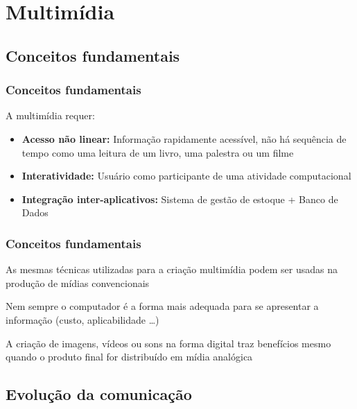 \documentclass[xcolor]{beamer}
\begin{document}
\section{Multimídia}
\subsection{Conceitos fundamentais}
\begin{frame}
    \frametitle{Conceitos fundamentais}


    A multimídia requer:

    \begin{itemize}
        \item {\bf Acesso não linear:} Informação rapidamente acessível, não há
sequência de tempo como uma leitura de um livro, uma palestra ou um filme
        \item {\bf Interatividade:} Usuário como participante de uma atividade
computacional
        \item {\bf Integração inter-aplicativos:} Sistema de gestão de estoque +
Banco de Dados
    \end{itemize}
\end{frame}

\begin{frame}
    \frametitle{Conceitos fundamentais}

    As mesmas técnicas utilizadas para a criação multimídia podem ser usadas na
produção de mídias convencionais 

    \vspace{0.25cm}

Nem sempre o computador é a forma mais adequada para se apresentar a informação
(custo, aplicabilidade \ldots)

    \vspace{0.25cm}

    A criação de imagens, vídeos ou sons na forma digital traz benefícios mesmo
quando o produto final for distribuído em mídia analógica
\end{frame}

\subsection{Evolução da comunicação}
\end{document}

